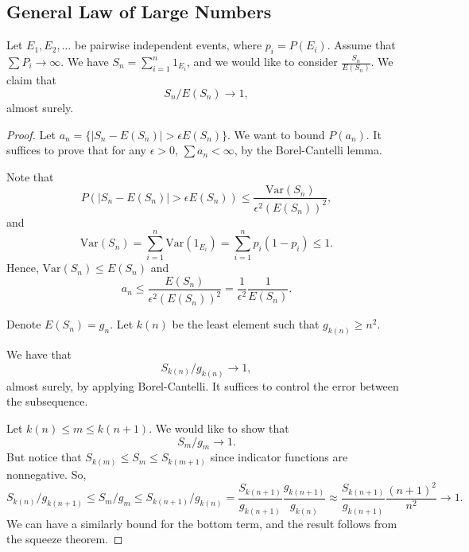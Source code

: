 \documentclass[11pt]{scrartcl}
\begin{document}
\subsection{General Law of Large Numbers}
Let $E_1, E_2, \dots$ be pairwise independent events, where $p_i = P(E_i)$.  Assume that $\sum P_i \rightarrow \infty$.  We have $S_n = \sum_{i=1}^n 1_{E_i}$, and we would like to consider $\frac{S_n}{E(S_n)}$.  We claim that 
$$S_n/E(S_n) \rightarrow 1,$$
almost surely.
\begin{proof}
Let $a_n = \{|S_n - E(S_n)| > \epsilon E(S_n)\}$.  We want to bound $P(a_n)$.  It suffices to prove that for any $\epsilon > 0$, $\sum a_n < \infty$, by the Borel-Cantelli lemma.

Note that
 $$P(|S_n - E(S_n)| > \epsilon E(S_n)) \le \frac{\text{Var}(S_n)}{\epsilon^2 (E(S_n))^2},$$
 and $$\text{Var}(S_n) = \sum_{i=1}^n \text{Var}(1_{E_i}) = \sum_{i=1}^n p_i(1-p_i) \le 1.$$
 Hence, $\text{Var}(S_n) \le E(S_n)$ and 
 $$a_n \le \frac{E(S_n)}{\epsilon^2(E(S_n))^2} = \frac{1}{\epsilon^2} \frac{1}{E(S_n)}.$$
 
 Denote $E(S_n) = g_n$.  Let $k(n)$ be the least element such that $g_{k(n)} \ge n^2$.  
 
 We have that $$S_{k(n)}/g_{k(n)} \rightarrow 1,$$
 almost surely, by applying Borel-Cantelli.  It suffices to control the error between the subsequence.
 
 Let $k(n) \le m \le k(n+1)$.  We would like to show that 
 $$S_m/g_{m} \rightarrow 1.$$
 But notice that $S_{k(m)} \le S_m \le S_{k(m+1)}$ since indicator functions are nonnegative.  So,
 $$S_{k(n)}/g_{k(n+1)} \le S_m/g_m \le S_{k(n+1)}/g_{k(n)} = \frac{S_{k(n+1)}}{g_{k(n+1)}}\frac{g_{k(n+1)}}{g_{k(n)}} \approx\frac{S_{k(n+1)}}{g_{k(n+1)}}\frac{(n+1)^2}{n^2} \rightarrow 1.$$
 We can have a similarly bound for the bottom term, and the result follows from the squeeze theorem.
\end{proof}
\end{document}
